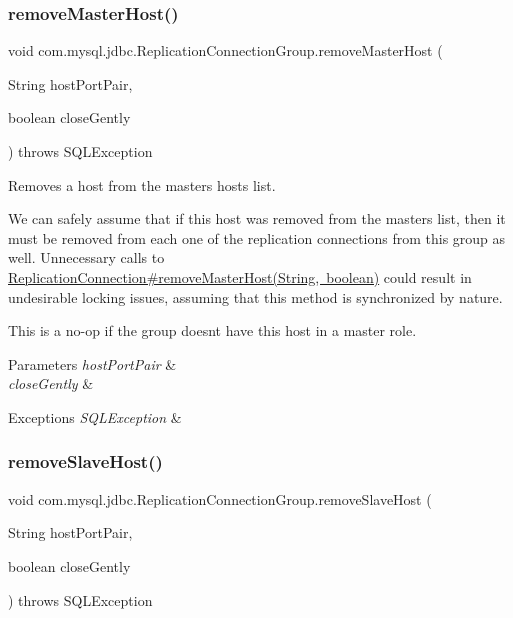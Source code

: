 \subsubsection{\texorpdfstring{remove\+Master\+Host()}{removeMasterHost()}\hspace{0.1cm}{\footnotesize\ttfamily [2/2]}}
{\footnotesize\ttfamily void com.\+mysql.\+jdbc.\+Replication\+Connection\+Group.\+remove\+Master\+Host (\begin{DoxyParamCaption}\item[{String}]{host\+Port\+Pair,  }\item[{boolean}]{close\+Gently }\end{DoxyParamCaption}) throws S\+Q\+L\+Exception}

Removes a host from the masters hosts list.

We can safely assume that if this host was removed from the masters list, then it must be removed from each one of the replication connections from this group as well. Unnecessary calls to \mbox{\hyperlink{}{Replication\+Connection\#remove\+Master\+Host(\+String, boolean)}} could result in undesirable locking issues, assuming that this method is synchronized by nature.

This is a no-\/op if the group doesn\textquotesingle{}t have this host in a master role.


\begin{DoxyParams}{Parameters}
{\em host\+Port\+Pair} & \\
\hline
{\em close\+Gently} & \\
\hline
\end{DoxyParams}

\begin{DoxyExceptions}{Exceptions}
{\em S\+Q\+L\+Exception} & \\
\hline
\end{DoxyExceptions}
\mbox{\label{classcom_1_1mysql_1_1jdbc_1_1_replication_connection_group_a0edd408afd3be5821bae63d00bdef097}} 
\subsubsection{\texorpdfstring{remove\+Slave\+Host()}{removeSlaveHost()}}
{\footnotesize\ttfamily void com.\+mysql.\+jdbc.\+Replication\+Connection\+Group.\+remove\+Slave\+Host (\begin{DoxyParamCaption}\item[{String}]{host\+Port\+Pair,  }\item[{boolean}]{close\+Gently }\end{DoxyParamCaption}) throws S\+Q\+L\+Exception}


